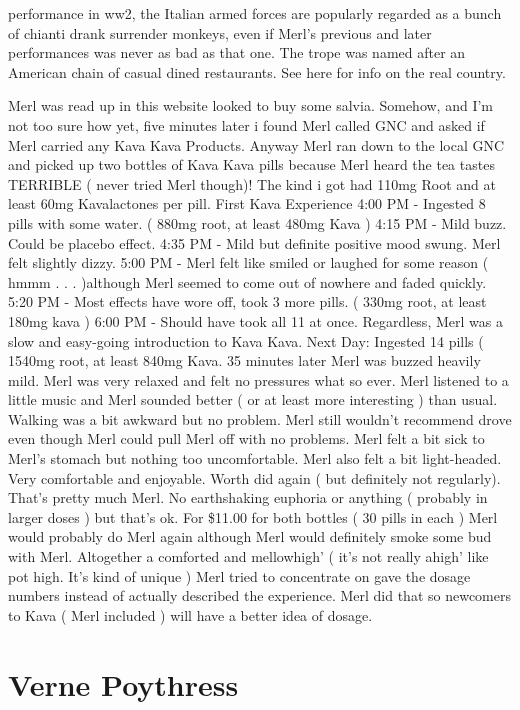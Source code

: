 \documentclass[12pt]{book}
\begin{document}
performance in ww2, the Italian armed forces are popularly regarded as a bunch of chianti drank surrender monkeys, even if Merl's previous and later performances was never as bad as that one. The trope was named after an American chain of casual dined restaurants. See here for info on the real country.



Merl was read up in this website looked to buy some salvia. Somehow, and I'm not too sure how yet, five minutes later i found Merl called GNC and asked if Merl carried any Kava Kava Products. Anyway Merl ran down to the local GNC and picked up two bottles of Kava Kava pills because Merl heard the tea tastes TERRIBLE ( never tried Merl though)! The kind i got had 110mg Root and at least 60mg Kavalactones per pill. First Kava Experience 4:00 PM - Ingested 8 pills with some water. ( 880mg root, at least 480mg Kava ) 4:15 PM - Mild buzz. Could be placebo effect. 4:35 PM - Mild but definite positive mood swung. Merl felt slightly dizzy. 5:00 PM - Merl felt like smiled or laughed for some reason ( hmmm . . .  )although Merl seemed to come out of nowhere and faded quickly. 5:20 PM - Most effects have wore off, took 3 more pills. ( 330mg root, at least 180mg kava ) 6:00 PM - Should have took all 11 at once. Regardless, Merl was a slow and easy-going introduction to Kava Kava. Next Day: Ingested 14 pills ( 1540mg root, at least 840mg Kava. 35 minutes later Merl was buzzed heavily mild. Merl was very relaxed and felt no pressures what so ever. Merl listened to a little music and Merl sounded better ( or at least more interesting ) than usual. Walking was a bit awkward but no problem. Merl still wouldn't recommend drove even though Merl could pull Merl off with no problems. Merl felt a bit sick to Merl's stomach but nothing too uncomfortable. Merl also felt a bit light-headed. Very comfortable and enjoyable. Worth did again ( but definitely not regularly). That's pretty much Merl. No earthshaking euphoria or anything ( probably in larger doses ) but that's ok. For \$11.00 for both bottles ( 30 pills in each ) Merl would probably do Merl again although Merl would definitely smoke some bud with Merl. Altogether a comforted and mellowhigh' ( it's not really ahigh' like pot high. It's kind of unique ) Merl tried to concentrate on gave the dosage numbers instead of actually described the experience. Merl did that so newcomers to Kava ( Merl included ) will have a better idea of dosage.



\chapter{Verne Poythress}
\end{document}
